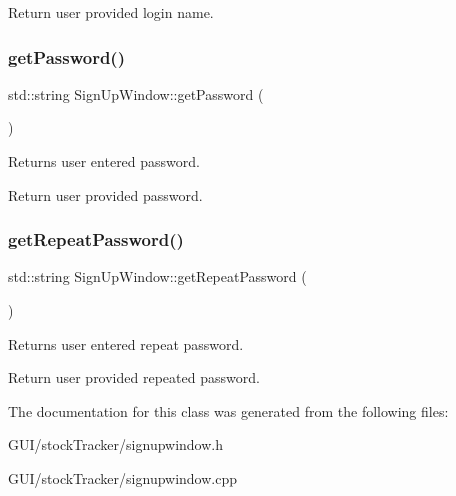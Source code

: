 Return user provided login name. \mbox{\label{class_sign_up_window_aa12ab939d6f9ff106c0190c2b330259c}} 
\subsubsection{\texorpdfstring{get\+Password()}{getPassword()}}
{\footnotesize\ttfamily std\+::string Sign\+Up\+Window\+::get\+Password (\begin{DoxyParamCaption}{ }\end{DoxyParamCaption})}



Returns user entered password. 

Return user provided password. \mbox{\label{class_sign_up_window_aaf6fae547c07d475b902e9aa6a2c7749}} 
\subsubsection{\texorpdfstring{get\+Repeat\+Password()}{getRepeatPassword()}}
{\footnotesize\ttfamily std\+::string Sign\+Up\+Window\+::get\+Repeat\+Password (\begin{DoxyParamCaption}{ }\end{DoxyParamCaption})}



Returns user entered repeat password. 

Return user provided repeated password. 

The documentation for this class was generated from the following files\+:\begin{DoxyCompactItemize}
\item 
G\+U\+I/stock\+Tracker/signupwindow.\+h\item 
G\+U\+I/stock\+Tracker/signupwindow.\+cpp\end{DoxyCompactItemize}
